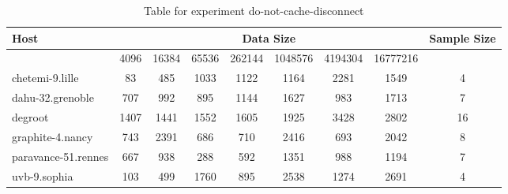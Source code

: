 \begin{table}
\caption{Table for experiment do-not-cache-disconnect}
\begin{tabular}{@{}lcccccccc@{}}
\toprule
Host    & \multicolumn{7}{c}{Data Size}          & Sample Size \\ \midrule
& 4096  & 16384  & 65536  & 262144  & 1048576  & 4194304  & 16777216              \\ \midrule
chetemi-9.lille  & 83  & 485  & 1033  & 1122  & 1164  & 2281  & 1549  & 4 \\
dahu-32.grenoble  & 707  & 992  & 895  & 1144  & 1627  & 983  & 1713  & 7 \\
degroot  & 1407  & 1441  & 1552  & 1605  & 1925  & 3428  & 2802  & 16 \\
graphite-4.nancy  & 743  & 2391  & 686  & 710  & 2416  & 693  & 2042  & 8 \\
paravance-51.rennes  & 667  & 938  & 288  & 592  & 1351  & 988  & 1194  & 7 \\
uvb-9.sophia  & 103  & 499  & 1760  & 895  & 2538  & 1274  & 2691  & 4 \\
\bottomrule
\end{tabular}
\end{table}
